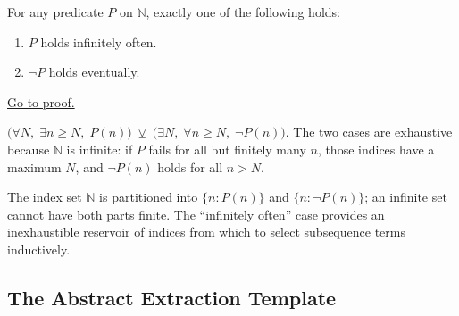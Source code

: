 \begin{proposition}
\label{prop:io-ev-dichotomy}
For any predicate $P$ on $\mathbb{N}$, exactly one of the following holds:
\begin{enumerate}[label=(\roman*)]
  \item $P$ holds infinitely often.
  \item $\neg P$ holds eventually.
\end{enumerate}
\hyperref[prf:io-ev-dichotomy]{Go to proof.}
\end{proposition}

\begin{remark*}
\end{remark*}


\begin{remark}
$\bigl(\forall N,\;\exists n\geq N,\;P(n)\bigr)
\;\veebar\;
\bigl(\exists N,\;\forall n\geq N,\;\neg P(n)\bigr)$.
The two cases are exhaustive because $\mathbb{N}$ is infinite: if $P$
fails for all but finitely many $n$, those indices have a maximum $N$,
and $\neg P(n)$ holds for all $n>N$.
\end{remark}

\begin{remark}
The index set $\mathbb{N}$ is partitioned into $\{n:P(n)\}$ and
$\{n:\neg P(n)\}$; an infinite set cannot have both parts finite. The
``infinitely often'' case provides an inexhaustible reservoir of indices
from which to select subsequence terms inductively.
\end{remark}

\subsection*{The Abstract Extraction Template}
\label{subsec:extraction-template}

